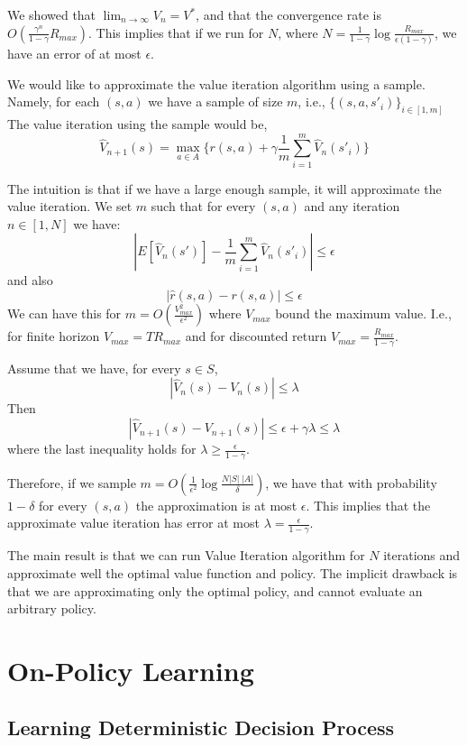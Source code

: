 We showed that $\lim_{n\rightarrow \infty}V_n =V^*$, and that the
convergence rate is $O(\frac{\gamma^n}{1-\gamma}R_{max})$.
%
This implies that if we run for $N$, where $N=\frac{1}{1-\gamma}\log
\frac{R_{max}}{\epsilon(1-\gamma)}$, we have an error of at most
$\epsilon$.


We would like to approximate the value iteration algorithm using a
sample. Namely, for each $(s,a)$ we have a sample of size $m$, i.e.,
$\{(s,a,s'_i)\}_{i\in[1,m]}$ The value iteration using the sample would
be,
\[
\widehat{V}_{n+1}(s)=\max_{a\in A} \{ r(s,a)+\gamma
\frac{1}{m}\sum_{i=1}^m \widehat{V}_n(s'_i)\}
\]


The intuition is that if we have a large enough sample, it will
approximate the value iteration. We set $m$ such that for every
$(s,a)$ and any iteration $n\in[1,N]$ we have:
\[
|E[\widehat{V}_n(s')]-\frac{1}{m}\sum_{i=1}^m \widehat{V}_n(s'_i)|\leq
\epsilon
\]
and also
\[
|\widehat{r}(s,a)-r(s,a)|\leq\epsilon
\]
We can have this for $m=O(\frac{V^2_{max}}{\epsilon^2})$ where
$V_{max}$ bound the maximum value. I.e., for finite horizon
$V_{max}=T R_{max}$ and for discounted return
$V_{max}=\frac{R_{max}}{1-\gamma}$.

Assume that we have, for every $s\in S$,
\[
|\widehat{V}_n(s) - V_n(s)|\leq \lambda
\]
Then
\[
|\widehat{V}_{n+1}(s)-V_{n+1}(s)|\leq \epsilon+\gamma\lambda\leq
\lambda
\]
where the last inequality holds for $\lambda\geq
\frac{\epsilon}{1-\gamma}$.

Therefore, if we sample $m=O(\frac{1}{\epsilon^2}\log \frac{N |S|
\;|A|}{\delta})$, we have that with probability $1-\delta$ for every
$(s,a)$ the approximation is at most $\epsilon$. This implies that
the approximate value iteration has error at most
$\lambda=\frac{\epsilon}{1-\gamma}$.

The main result is that we can run Value Iteration algorithm for $N$
iterations and approximate well the optimal value function and
policy.
%
The implicit drawback is that we are approximating only the optimal
policy, and cannot evaluate an arbitrary policy.

\section{On-Policy Learning}

\subsection{Learning Deterministic Decision Process}

